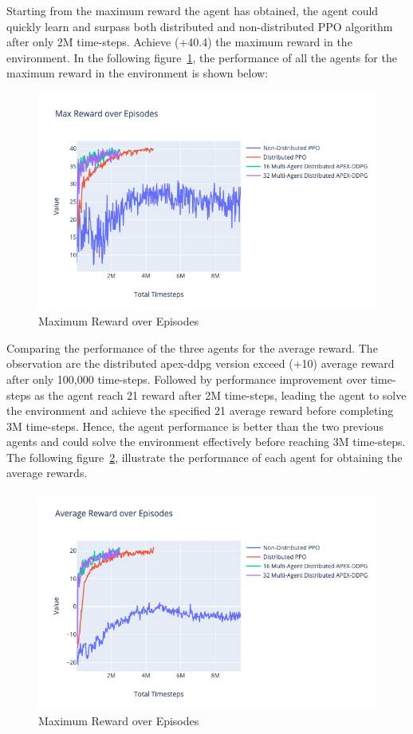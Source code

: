Starting from the maximum reward the agent has obtained, the agent could quickly learn and surpass both distributed and non-distributed PPO algorithm after only 2M time-steps. Achieve (+40.4) the maximum reward in the environment. In the following figure~\ref{fig:3rd_exp_max_eps_reward}, the performance of all the agents for the maximum reward in the environment is shown below:
\begin{figure}[!htb]
		\centering
		\includegraphics[width=\linewidth]{figures/exps/3rd_exp/max_eps_reward.png}
		\caption{Maximum Reward over Episodes}
		\label{fig:3rd_exp_max_eps_reward}
\end{figure}

Comparing the performance of the three agents for the average reward. The observation are the distributed apex-ddpg version exceed (+10) average reward after only 100,000 time-steps. Followed by performance improvement over time-steps as the agent reach 21 reward after 2M time-steps, leading the agent to solve the environment and achieve the specified 21 average reward before completing 3M time-steps. Hence, the agent performance is better than the two previous agents and could solve the environment effectively before reaching 3M time-steps. The following figure~\ref{fig:3rd_exp_avg_eps_reward}, illustrate the performance of each agent for obtaining the average rewards.
\begin{figure}[!htb]
		\centering
		\includegraphics[width=\linewidth]{figures/exps/3rd_exp/avg_eps_reward.png}
		\caption{Maximum Reward over Episodes}
		\label{fig:3rd_exp_avg_eps_reward}
\end{figure}

